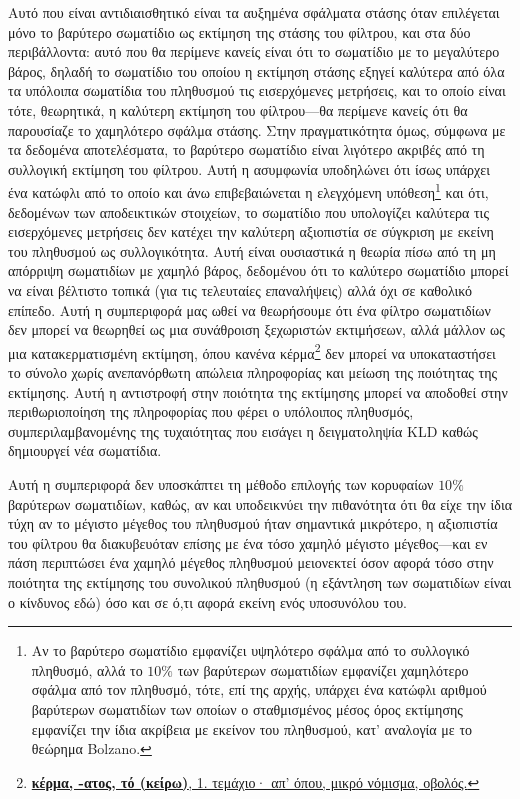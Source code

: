 Αυτό που είναι αντιδιαισθητικό είναι τα αυξημένα σφάλματα στάσης όταν
επιλέγεται μόνο το βαρύτερο σωματίδιο ως εκτίμηση της στάσης του φίλτρου, και
στα δύο περιβάλλοντα: αυτό που θα περίμενε κανείς είναι ότι το σωματίδιο με το
μεγαλύτερο βάρος, δηλαδή το σωματίδιο του οποίου η εκτίμηση στάσης εξηγεί
καλύτερα από όλα τα υπόλοιπα σωματίδια του πληθυσμού τις εισερχόμενες
μετρήσεις, και το οποίο είναι τότε, θεωρητικά, η καλύτερη εκτίμηση του
φίλτρου---θα περίμενε κανείς ότι θα παρουσίαζε το χαμηλότερο σφάλμα στάσης.
Στην πραγματικότητα όμως, σύμφωνα με τα δεδομένα αποτελέσματα, το βαρύτερο
σωματίδιο είναι λιγότερο ακριβές από τη συλλογική εκτίμηση του φίλτρου. Αυτή η
ασυμφωνία υποδηλώνει ότι ίσως υπάρχει ένα κατώφλι από το οποίο και άνω
επιβεβαιώνεται η ελεγχόμενη υπόθεση\footnote{Αν το βαρύτερο σωματίδιο εμφανίζει
υψηλότερο σφάλμα από το συλλογικό πληθυσμό, αλλά το $10\%$ των βαρύτερων
σωματιδίων εμφανίζει χαμηλότερο σφάλμα από τον πληθυσμό, τότε, επί της αρχής,
υπάρχει ένα κατώφλι αριθμού βαρύτερων σωματιδίων των οποίων ο σταθμισμένος
μέσος όρος εκτίμησης εμφανίζει την ίδια ακρίβεια με εκείνον του πληθυσμού, κατ'
αναλογία με το θεώρημα Bolzano.} και ότι, δεδομένων των αποδεικτικών στοιχείων,
το σωματίδιο που υπολογίζει καλύτερα τις εισερχόμενες μετρήσεις δεν κατέχει την
καλύτερη αξιοπιστία σε σύγκριση με εκείνη του πληθυσμού ως συλλογικότητα. Αυτή
είναι ουσιαστικά η θεωρία πίσω από τη μη απόρριψη σωματιδίων με χαμηλό βάρος,
δεδομένου ότι το καλύτερο σωματίδιο μπορεί να είναι βέλτιστο τοπικά (για τις
τελευταίες επαναλήψεις) αλλά όχι σε καθολικό επίπεδο. Αυτή η συμπεριφορά μας
ωθεί να θεωρήσουμε ότι ένα φίλτρο σωματιδίων δεν μπορεί να θεωρηθεί ως μια
συνάθροιση ξεχωριστών εκτιμήσεων, αλλά μάλλον ως μια κατακερματισμένη εκτίμηση,
όπου κανένα
κέρμα\footnote{\href{https://www.greek-language.gr/digitalResources/ancient_greek/tools/liddell-scott/search.html?lq=\%CE\%BA\%CE\%AD\%CF\%81\%CE\%BC\%CE\%B1}
{\textbf{κέρμα, -ατος, τό (κείρω)}, 1.  τεμάχιο· απ' όπου, μικρό νόμισμα,
οβολός.}} δεν μπορεί να υποκαταστήσει το σύνολο χωρίς ανεπανόρθωτη απώλεια
πληροφορίας και μείωση της ποιότητας της εκτίμησης. Αυτή η αντιστροφή στην
ποιότητα της εκτίμησης μπορεί να αποδοθεί στην περιθωριοποίηση της πληροφορίας
που φέρει ο υπόλοιπος πληθυσμός, συμπεριλαμβανομένης της τυχαιότητας που
εισάγει η δειγματοληψία KLD καθώς δημιουργεί νέα σωματίδια.

Αυτή η συμπεριφορά δεν υποσκάπτει τη μέθοδο επιλογής των κορυφαίων $10\%$
βαρύτερων σωματιδίων, καθώς, αν και υποδεικνύει την πιθανότητα ότι θα είχε την
ίδια τύχη αν το μέγιστο μέγεθος του πληθυσμού ήταν σημαντικά μικρότερο, η
αξιοπιστία του φίλτρου θα διακυβευόταν επίσης με ένα τόσο χαμηλό μέγιστο
μέγεθος---και εν πάση περιπτώσει ένα χαμηλό μέγεθος πληθυσμού μειονεκτεί όσον
αφορά τόσο στην ποιότητα της εκτίμησης του συνολικού πληθυσμού (η εξάντληση των
σωματιδίων είναι ο κίνδυνος εδώ) όσο και σε ό,τι αφορά εκείνη ενός υποσυνόλου
του.


